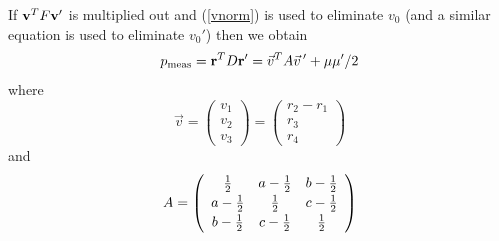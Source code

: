 \documentclass[12pt]{article}
\begin{document}
If ${\bf v}^T F {\bf v}'$ is multiplied out and (\ref{vnorm}) is used to
eliminate $v_0$ (and a similar equation is used to eliminate $v_0'$) then
we obtain
\begin{equation}\label{bloch}
p_{\rm meas} = {\bf r}^T D {\bf r}' = \vec{v}^T A \vec{v}\,'
+ \mu\mu'/2
\end{equation}
where
\begin{equation}
 \vec{v}= \left( \begin{array}{c} v_1 \\ v_2 \\ v_3 \end{array}\right)
=  \left( \begin{array}{c} r_2-r_1 \\ r_3 \\ r_4
 \end{array}\right)
\end{equation}
and
\begin{equation}
A= \left( \begin{array}{ccc}  {1\over 2} &   a-{1\over 2}  &  b -{1\over 2}  \\[2pt]
                              a-{1\over 2} & {1\over 2} &  c-{1\over 2}  \\[2pt]
                              b-{1\over 2} &  c-{1\over 2}& {1\over 2}
                              \end{array} \right)
\end{equation}
\end{document}
